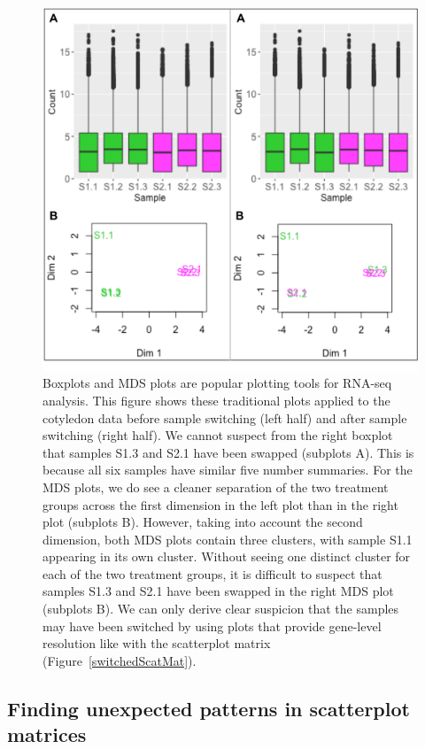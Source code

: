 \documentclass{bioinfo}
\begin{document}
\begin{figure}[!tpb]
\centerline{\includegraphics[width=\columnwidth]{../Bioinformatics/Pictures/mdsSwitch.png}}
\caption{Boxplots and MDS plots are popular plotting tools for RNA-seq analysis. This figure shows these traditional plots applied to the cotyledon data before sample switching (left half) and after sample switching (right half). We cannot suspect from the right boxplot that samples S1.3 and S2.1 have been swapped (subplots A). This is because all six samples have similar five number summaries. For the MDS plots, we do see a cleaner separation of the two treatment groups across the first dimension in the left plot than in the right plot (subplots B). However, taking into account the second dimension, both MDS plots contain three clusters, with sample S1.1 appearing in its own cluster. Without seeing one distinct cluster for each of the two treatment groups, it is difficult to suspect that samples S1.3 and S2.1 have been swapped in the right MDS plot (subplots B). We can only derive clear suspicion that the samples may have been switched by using plots that provide gene-level resolution like with the scatterplot matrix (Figure~\ref{switchedScatMat}).
\label{mdsSwitch}}
\end{figure}

\subsection{Finding unexpected patterns in scatterplot matrices}
\end{document}

